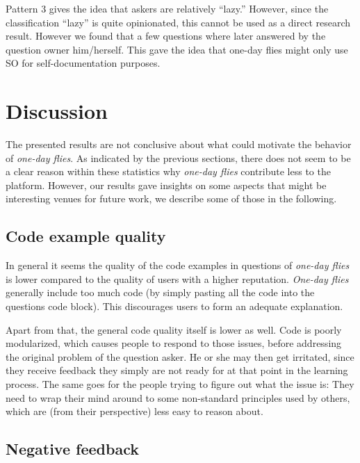 \documentclass[conference]{IEEEtran}
\newcommand\odf{\emph{one-day flies}\xspace}
\newcommand\Odf{\emph{One-day flies}\xspace}
\begin{document}
Pattern 3 gives the idea that askers are relatively ``lazy.'' However, since
the classification ``lazy'' is quite opinionated, this cannot be used as a
direct research result. However we found that a few questions where later
answered by the question owner him/herself. This gave the idea that one-day
flies might only use SO for self-documentation purposes. 

\section{Discussion} \label{NewResearchQuestions}




The presented results are not conclusive about what could motivate the behavior
of \odf. As indicated by the previous sections, there does not seem to be a clear reason
within these statistics why \odf contribute less to the platform.  However, our
results gave insights on some aspects that might be interesting venues for
future work, we describe some of those in the following. 

\subsection{Code example quality}

In general it seems the quality of the code examples in questions of
\odf is lower compared to the quality of users with a higher
reputation. \Odf generally include too much code (by simply pasting
all the code into the questions code block). This discourages users to form an
adequate explanation.

Apart from that, the general code quality itself is lower as well. Code is
poorly modularized, which causes people to respond to those issues, before
addressing the original problem of the question asker. He or she may then get
irritated, since they receive feedback they simply are not ready for at that
point in the learning process. The same goes for the people trying to figure
out what the issue is: They need to wrap their mind around to some non-standard
principles used by others, which are (from their perspective) less easy to
reason about.

\subsection{Negative feedback}
\end{document}
